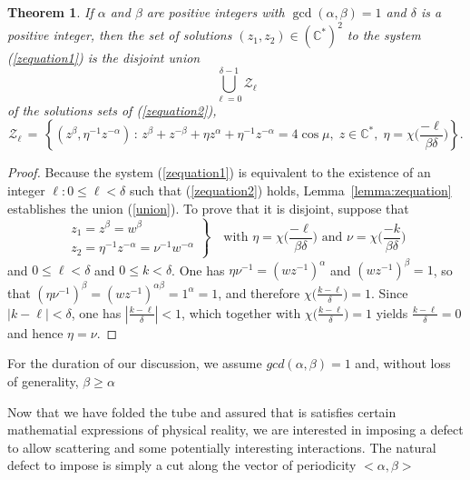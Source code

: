\documentclass[12pt]{article}
\newtheorem{theorem}{Theorem}
\newcommand{\CC}{\mathbb{C}}
\newcommand{\cchi}[1]{{\textstyle{\chi\big(#1\big)}}}
\begin{document}
\begin{theorem}\label{thm:zequation}
If $\alpha$ and $\beta$ are positive integers with $\gcd(\alpha,\beta)=1$ and $\delta$ is a positive integer, then
the set of solutions $(z_1,z_2)\in(\CC^*)^2$ to the system (\ref{zequation1}) is the {\em disjoint} union
%
\begin{equation}
  \bigcup\limits_{\ell=0}^{\delta-1} {\mathcal Z}_\ell
\end{equation}
%
of the solutions sets of (\ref{zequation2}),
%
\begin{equation}\label{union}
  {\mathcal Z}_\ell \,=\,
  \left\{ (z^\beta, \eta^{-1}z^{-\alpha})\,:\,
    z^\beta + z^{-\beta} + \eta z^\alpha + \eta^{-1} z^{-\alpha} = 4\cos\mu,\; z\in\CC^*,\; \eta=\cchi{\frac{-\ell}{\beta\delta}}
  \right\}.
\end{equation}
%
\end{theorem}

\begin{proof}
Because the system (\ref{zequation1}) is equivalent to the existence of an integer $\ell:0\leq\ell<\delta$ such that (\ref{zequation2}) holds, Lemma~\ref{lemma:zequation} establishes the union (\ref{union}).  To prove that it is disjoint, suppose that
%
\begin{equation}
  \renewcommand{\arraystretch}{1.1}
\left.
  \begin{array}{r}
    z_1=z^{\beta} = w^{\beta} \\
    z_2 = \eta^{-1} z^{-\alpha} = \nu^{-1} w^{-\alpha}
  \end{array}
\right\}
\quad\text{with $\eta=\cchi{\frac{-\ell}{\beta\delta}}$ and $\nu=\cchi{\frac{-k}{\beta\delta}}$}
\end{equation}
%
and $0\leq\ell<\delta$ and $0\leq k<\delta$.
One has $\eta\nu^{-1}=(wz^{-1})^\alpha$ and $(wz^{-1})^\beta=1$, so that
$(\eta\nu^{-1})^\beta = (wz^{-1})^{\alpha\beta} = 1^\alpha = 1$, and therefore $\cchi{\frac{k-\ell}{\delta}}=1$.  Since $|k-\ell|<\delta$, one has $\left| \frac{k-\ell}{\delta} \right|<1$, which together with $\cchi{\frac{k-\ell}{\delta}}=1$ yields $\frac{k-\ell}{\delta}=0$ and hence $\eta=\nu$.
\end{proof}

For the duration of our discussion, we assume $gcd(\alpha, \beta) = 1$ and, without loss of generality, $\beta \geq \alpha$

Now that we have folded the tube and assured that is satisfies certain mathematial expressions of physical reality, we are interested in imposing a defect to allow scattering and some potentially interesting interactions. The natural defect to impose is simply a cut along the vector of periodicity $<\alpha, \beta>$ 
\end{document}
